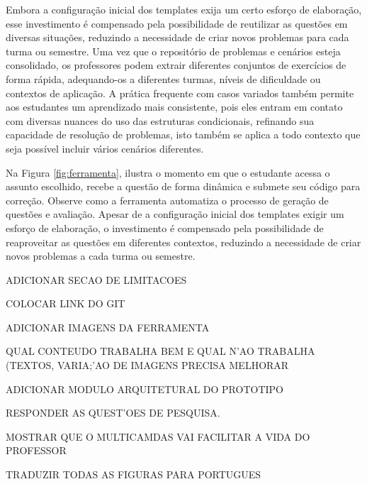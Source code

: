 Embora a configuração inicial dos templates exija um certo esforço de elaboração, esse investimento é compensado pela possibilidade de reutilizar as questões em diversas situações, reduzindo a necessidade de criar novos problemas para cada turma ou semestre. Uma vez que o repositório de problemas e cenários esteja consolidado, os professores podem extrair diferentes conjuntos de exercícios de forma rápida, adequando-os a diferentes turmas, níveis de dificuldade ou contextos de aplicação. A prática frequente com casos variados também permite aos estudantes um aprendizado mais consistente, pois eles entram em contato com diversas nuances do uso das estruturas condicionais, refinando sua capacidade de resolução de problemas, isto também se aplica a todo contexto que seja possível incluir vários cenários diferentes.



Na Figura \ref{fig:ferramenta}, ilustra o momento em que o estudante acessa o assunto escolhido, recebe a questão de forma dinâmica e submete seu código para correção. Observe como a ferramenta automatiza o processo de geração de questões e avaliação. Apesar de a configuração inicial dos templates exigir um esforço de elaboração, o investimento é compensado pela possibilidade de reaproveitar as questões em diferentes contextos, reduzindo a necessidade de criar novos problemas a cada turma ou semestre. 

ADICIONAR SECAO DE LIMITACOES

COLOCAR LINK DO GIT

ADICIONAR IMAGENS DA FERRAMENTA

QUAL CONTEUDO TRABALHA BEM E QUAL N'AO TRABALHA  (TEXTOS, VARIA;'AO DE IMAGENS PRECISA MELHORAR

ADICIONAR MODULO ARQUITETURAL DO PROTOTIPO

RESPONDER AS QUEST'OES DE PESQUISA. 

MOSTRAR QUE O MULTICAMDAS VAI FACILITAR A VIDA DO PROFESSOR

TRADUZIR TODAS AS FIGURAS PARA PORTUGUES


 
